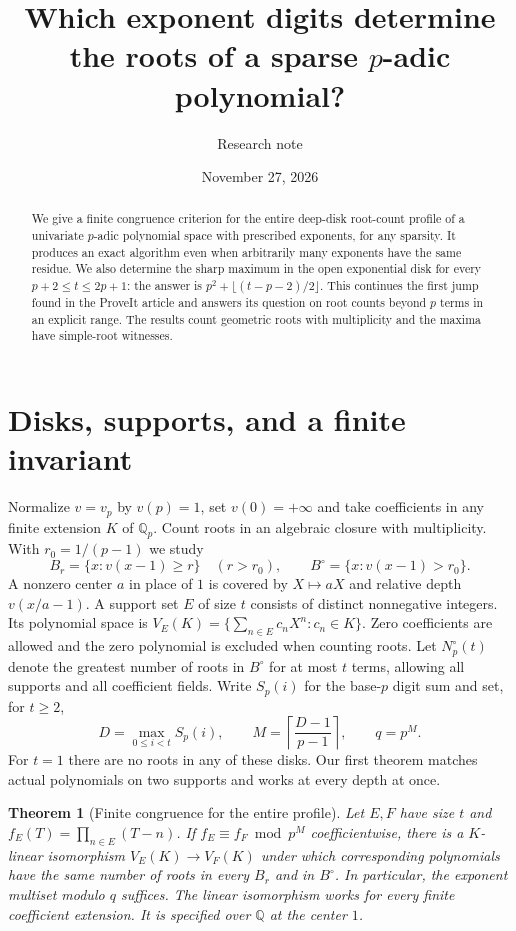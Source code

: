 \documentclass[11pt]{article}
\title{\bfseries Which exponent digits determine\\ the roots of a sparse $p$-adic polynomial?}
\author{Research note}\date{November 27, 2026}
\newtheorem{theorem}{Theorem}\newtheorem{lemma}[theorem]{Lemma}
\newcommand{\Q}{\mathbb Q}\newcommand{\Z}{\mathbb Z}
\begin{document}
\maketitle
\begin{abstract}
We give a finite congruence criterion for the entire deep-disk root-count profile of a univariate $p$-adic polynomial space with prescribed exponents, for any sparsity. It produces an exact algorithm even when arbitrarily many exponents have the same residue. We also determine the sharp maximum in the open exponential disk for every $p+2\le t\le 2p+1$: the answer is $p^2+\lfloor(t-p-2)/2\rfloor$. This continues the first jump found in the ProveIt article and answers its question on root counts beyond $p$ terms in an explicit range. The results count geometric roots with multiplicity and the maxima have simple-root witnesses.
\end{abstract}

\section{Disks, supports, and a finite invariant}
Normalize $v=v_p$ by $v(p)=1$, set $v(0)=+\infty$ and take coefficients in any finite extension $K$ of $\Q_p$. Count roots in an algebraic closure with multiplicity. With $r_0=1/(p-1)$ we study
\[
   B_r=\{x:v(x-1)\ge r\}\quad(r>r_0),\qquad B^\circ=\{x:v(x-1)>r_0\}.
\]
A nonzero center $a$ in place of $1$ is covered by $X\mapsto aX$ and relative depth $v(x/a-1)$. A support set $E$ of size $t$ consists of distinct nonnegative integers. Its polynomial space is $V_E(K)=\{\sum_{n\in E}c_nX^n:c_n\in K\}$. Zero coefficients are allowed and the zero polynomial is excluded when counting roots. Let $N_p^\circ(t)$ denote the greatest number of roots in $B^\circ$ for at most $t$ terms, allowing all supports and all coefficient fields. Write $S_p(i)$ for the base-$p$ digit sum and set, for $t\ge2$,
\[
 D=\max_{0\le i<t}S_p(i),\qquad M=\left\lceil\frac{D-1}{p-1}\right\rceil,\qquad q=p^M .
\]
For $t=1$ there are no roots in any of these disks. Our first theorem matches actual polynomials on two supports and works at every depth at once.

\begin{theorem}[Finite congruence for the entire profile]\label{transfer}
Let $E,F$ have size $t$ and $f_E(T)=\prod_{n\in E}(T-n)$. If $f_E\equiv f_F\bmod p^M$ coefficientwise, there is a $K$-linear isomorphism $V_E(K)\to V_F(K)$ under which corresponding polynomials have the same number of roots in every $B_r$ and in $B^\circ$. In particular, the exponent multiset modulo $q$ suffices. The linear isomorphism works for every finite coefficient extension. It is specified over $\Q$ at the center $1$.
\end{theorem}
\end{document}
